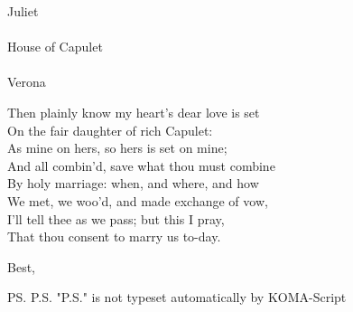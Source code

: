 \documentclass[foldmarks=false,refline=dateleft,fromrule=afteraddress,enlargefirstpage=on,fontsize=12pt,fromalign=center,subject=left,parskip=full]{scrlttr2}
\date{June  4, 2015.}
\begin{document}

\begin{letter}{%
Juliet \\\\
House of Capulet \\\\
Verona \\}

\opening{}


Then plainly know my heart's dear love is set \\
On the fair daughter of rich Capulet: \\
As mine on hers, so hers is set on mine; \\
And all combin'd, save what thou must combine \\
By holy marriage: when, and where, and how \\
We met, we woo'd, and made exchange of vow, \\
I'll tell thee as we pass; but this I pray, \\
That thou consent to marry us to-day. \\

\closing{Best,}

\ps{P.S. "P.S." is not typeset automatically by KOMA-Script \\}
\end{letter}

\end{document}
